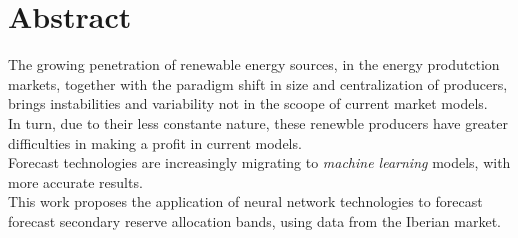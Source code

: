 \chapter{Abstract}
The growing penetration of renewable energy sources, in the energy produtction markets, together with the paradigm shift in size and centralization of producers, brings instabilities and variability not in the scoope of current market models. \\

In turn, due to their less constante nature, these renewble producers have greater difficulties in making a profit in current models. \\

Forecast technologies are increasingly migrating to \emph{machine learning} models, with more accurate results. \\

This work proposes the application of neural network technologies to forecast forecast secondary reserve allocation bands, using data from the Iberian market. \\

\vspace{0.5cm} %

